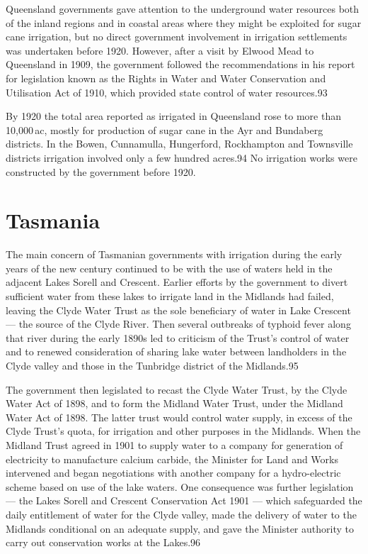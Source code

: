 Queensland governments gave attention to the underground water
resources both of the inland regions and in coastal areas where they
might be exploited for sugar cane irrigation, but no direct government
involvement in irrigation settlements was undertaken before 1920.
However, after a visit by Elwood Mead to Queensland in 1909, the
government followed the recommendations in his report for legislation
known as the Rights in Water and Water Conservation and Utilisation
Act of 1910, which provided state control of water resources.93

By 1920 the total area reported as irrigated in Queensland rose to
more than 10,000\,ac, mostly for production of sugar cane in the Ayr
and Bundaberg districts.  In the Bowen, Cunnamulla, Hungerford,
Rockhampton and Townsville districts irrigation involved only a few
hundred acres.94 No irrigation works were constructed by the
government before 1920.

\section{Tasmania}

The main concern of Tasmanian governments with irrigation during the
early years of the new century continued to be with the use of waters
held in the adjacent Lakes Sorell and Crescent.  Earlier efforts by
the government to divert sufficient water from these lakes to irrigate
land in the Midlands had failed, leaving the Clyde Water Trust as the
sole beneficiary of water in Lake Crescent --- the source of the Clyde
River.  Then several outbreaks of typhoid fever along that river
during the early 1890s led to criticism of the Trust's control of
water and to renewed consideration of sharing lake water between
landholders in the Clyde valley and those in the Tunbridge district of
the Midlands.95

The government then legislated to recast the Clyde Water Trust, by the
Clyde Water Act of 1898, and to form the Midland Water Trust, under
the Midland Water Act of 1898.  The latter trust would control water
supply, in excess of the Clyde Trust's quota, for irrigation and other
purposes in the Midlands.  When the Midland Trust agreed in 1901 to
supply water to a company for generation of electricity to manufacture
calcium carbide, the Minister for Land and Works intervened and began
negotiations with another company for a hydro-electric scheme based on
use of the lake waters.  One consequence was further legislation ---
the Lakes Sorell and Crescent Conservation Act 1901 --- which
safeguarded the daily entitlement of water for the Clyde valley, made
the delivery of water to the Midlands conditional on an adequate
supply, and gave the Minister authority to carry out conservation
works at the Lakes.96

